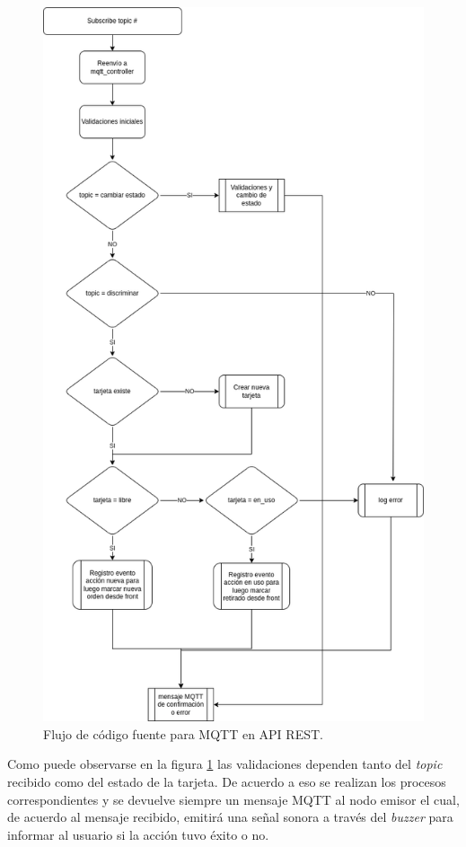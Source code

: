 \begin{figure}[H]
	\centering
	\includegraphics[scale=.50]{./Figures/mqtt-controller-api.png}
	\caption{Flujo de código fuente para MQTT en API REST.}
	\label{fig:mqttcontrollerapi}
\end{figure}

Como puede observarse en la figura \ref{fig:mqttcontrollerapi} las validaciones dependen tanto del \textit{topic} recibido como del estado de la tarjeta. De acuerdo a eso se realizan los procesos correspondientes y se devuelve siempre un mensaje MQTT al nodo emisor el cual, de acuerdo al mensaje recibido, emitirá una señal sonora a través del \textit{buzzer} para informar al usuario si la acción tuvo éxito o no.


